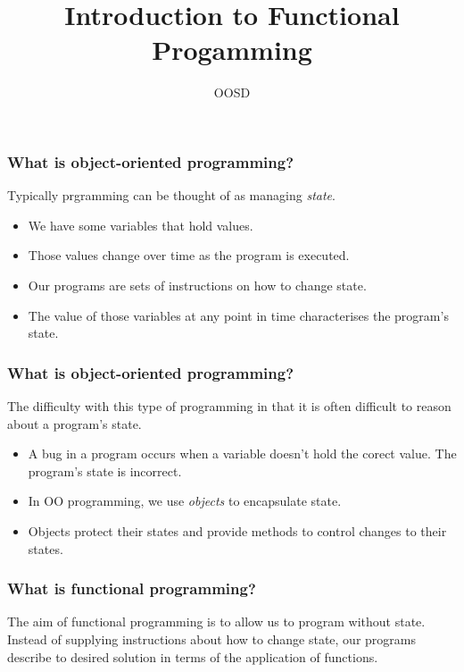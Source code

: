 \documentclass[10pt]{beamer}
\title{Introduction to Functional Progamming}
\author[IN710]{OOSD}
\institute[Otago Polytechnic]{
  School of Information Technology \\
  Otago Polytechnic \\
  Dunedin, New Zealand \\
}
\date{}
\begin{document}
\begin{frame}[plain]
  \titlepage
\end{frame}

\begin{frame}
  \frametitle{What is object-oriented programming?}

  Typically prgramming can be thought of as managing \emph{state}.
\begin{itemize}
  \item We have some variables that hold values.
  \item Those values change over time as the program is executed.
  \item Our programs are sets of instructions on how to change state.
  \item The value of those variables at any point in time characterises the
	  program's state.
\end{itemize}

\end{frame}
\begin{frame}
  \frametitle{What is object-oriented programming?}

  The difficulty with this type of programming in that it is often 
  difficult to reason about a program's state.
\begin{itemize}
  \item A bug in a program occurs when a variable doesn't hold the
	  corect value.  The program's state is incorrect.
  \item In OO programming, we use \emph{objects} to encapsulate state.
  \item Objects protect their states and provide methods to control changes 
	  to their states.  
\end{itemize}

\end{frame}
\begin{frame}
  \frametitle{What is functional programming?}

  The aim of functional programming is to allow us to program without state.
  Instead of supplying instructions about how to change state, our programs
  describe to desired solution in terms of the application of functions.

\end{frame}
\end{document}
